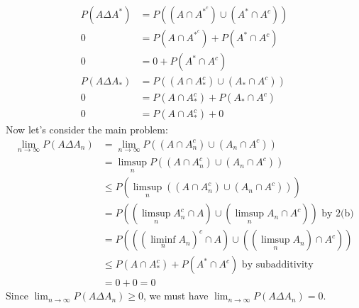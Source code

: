 \documentclass[12pt]{article}
\begin{document}
\begin{problem}[3]
\begin{enumerate}[label=\alph*)]
	\begin{align*}
		P(A \Delta A^* )&= P\left( (A \cap A^{*^c}) \cup  (A^* \cap A^{c}) \right)  \\
			0&= P(A \cap A^{*^c}) + P(A^*  \cap  A^{c}) \\
			0&= 0 + P(A^* \cap  A^{c})\\
			P(A \Delta A_*) &= P((A \cap A_*^{c}) \cup (A_* \cap A^{c}) ) \\
					0&= P(A \cap A_*^{c}) + P(A_* \cap A^{c}) \\
					0&= P(A \cap A_*^{c}) + 0 
	\end{align*}
Now let's consider the main problem:
\begin{align*}
	\lim_{ n \to \infty} P(A \Delta A_n) &= \lim_{ n \to \infty} P\left( (A \cap  A_n^{c}) \cup (A_n \cap A^{c}) \right) \\
	&= \limsup_{  n} P\left( (A \cap  A_n^{c}) \cup (A_n \cap A^{c}) \right) \\
	&\leq P\left( \limsup_{  n} \left( (A \cap A_n^{c}) \cup (A_n \cap A^{c}) \right)  \right)   \\
	&= P\left( \left( \limsup_{  n} A_n^{c} \cap A \right) \cup \left( \limsup_{  n} A_n \cap A^{c} \right)  \right) \text{ by 2(b)}  \\
	&= P\left( \left( \left( \liminf_{  n} A_n \right) ^{c} \cap A \right) \cup  \left( \left( \limsup_{  n} A_n \right) \cap A^{c} \right)  \right)  \\
	&\leq P(A \cap A_*^{c}) + P(A^* \cap A^{c})  \text{ by subadditivity} \\
	&= 0 + 0 =0 
\end{align*}
Since $ \lim_{ n \to \infty} P(A \Delta A_n) \geq 0$, we must have $ \lim_{ n \to \infty} P(A\Delta A_n) =0$.
\end{enumerate}
\end{problem}
\end{document}
